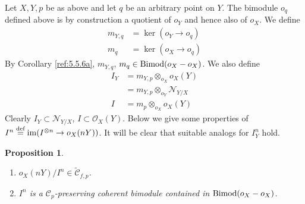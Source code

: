 \documentclass{amsproc}
\def\Cscr{{\mathcal C}}
\def\Nscr{{\mathcal N}}
\def\Oscr{{\mathcal O}}
\def\Bimod{\mathop{\text{Bimod}}}
\def\im{\operatorname {im}}
\def\ker{\operatorname {ker}}
\def\r{\rightarrow}
\let\oldtext\text
\def\text#1{\oldtext{\upshape #1}}
\newtheorem{propositions}[lemmas]{Proposition}
\theoremstyle{definition}
\theoremstyle{remark}
\numberwithin{equation}{section}
\numberwithin{table}{section}
\numberwithin{figure}{section}
\begin{document}
Let $X,Y,p$ be as above  
and let $q$ be an arbitrary point on $Y$. The bimodule $o_q$ defined
above is by construction
 a quotient of $o_Y$ and hence also of $o_X$. We define
\begin{align*}
m_{Y,q}&=\ker(o_Y\r o_q)\\
m_q&=\ker (o_X\r o_q)
\end{align*}
By Corollary \ref{ref:5.5.6a}, $m_{Y,q}$, $m_q\in \Bimod(o_X-o_X)$. We
also define
\begin{equation}
\label{ref:6.1b}
\begin{split}
I_Y&= m_{Y,p}\otimes_{o_X} o_X(Y)\\
&= m_{Y,p}\otimes_{o_Y}\Nscr_{Y/X}\\
{I}&= m_p\otimes_{o_X}o_X(Y)
\end{split}
\end{equation}
Clearly $I_Y\subset \Nscr_{Y/X}$, ${I}\subset \Oscr_X(Y)$. Below
we give some properties of ${I^n}\overset{\text{def}}{=}
\im(I^{\otimes n}\r o_X(nY))$. It will be clear that
suitable analogs for $I_Y^n$ hold.
\begin{propositions}
\label{ref:6.1.1a}
\begin{enumerate}
\item $o_X(nY)/{I}^n\in \tilde{\Cscr}_{f,p}$. \item ${I}^n$ is a
  $\Cscr_p$-preserving coherent bimodule contained in
  $\Bimod(o_X-o_X)$.
\end{enumerate}
\end{propositions}
\end{document}
